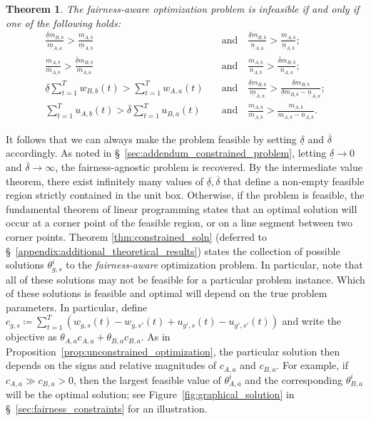 \documentclass[letterpaper]{article} %
\newtheorem{theorem}{Theorem}
\begin{document}
\begin{theorem}\label{theorem:feasibility}
The fairness-aware optimization problem is infeasible if and only if one of the following holds:
\footnotesize
    \begin{align*}
    \frac{\underline{\delta}m_{B,b}}{\underline{m}_{A,a}} > \frac{m_{A,b}}{\underline{m}_{A,b}}\quad &\text{and}\quad \frac{\underline{\delta}m_{B,b}}{\underline{n}_{A,a}} > \frac{m_{A,b}}{\underline{n}_{A,b}}; \\
    \frac{m_{A,b}}{\overline{m}_{A,b}} > \frac{\overline{\delta}m_{B,b}}{\overline{m}_{A,a}}\quad &\text{and}\quad \frac{m_{A,b}}{\overline{n}_{A,b}} > \frac{\overline{\delta} m_{B,b}}{\overline{n}_{A,a}}; \\
    \underline{\delta} \sum_{t=1}^T w_{B,b}(t) > \sum_{t=1}^T w_{A,a}(t)\quad &\text{and}\quad \frac{\underline{\delta} m_{B,b}}{\underline{m}_{A,a}} > \frac{\underline{\delta} m_{B,b}}{\underline{\delta} m_{B,b} - \underline{n}_{A,a}} ; \\
    \sum_{t=1}^T u_{A,b}(t) > \overline{\delta} \sum_{t=1}^T u_{B,a}(t)\quad &\text{and}\quad \frac{m_{A,b}}{\overline{m}_{A,b}} > \frac{m_{A,b}}{m_{A,b} - \overline{n}_{A,b}}.
\end{align*}
\end{theorem}
It follows that we can always make the problem feasible by setting $\underline{\delta}$ and $\overline{\delta}$ accordingly.
As noted in \S~\ref{sec:addendum_constrained_problem}, letting $\underline{\delta} \to 0$ and $\overline{\delta} \to \infty$, the fairness-agnostic problem is recovered.
By the intermediate value theorem, there exist infinitely many values of $\underline{\delta},\overline{\delta}$ that define a non-empty feasible region strictly contained in the unit box.
Otherwise, if the problem is feasible, the fundamental theorem of linear programming states that an optimal solution will occur at a corner point of the feasible region, or on a line segment between two corner points.
Theorem \ref{thm:constrained_soln} (deferred to \S~\ref{appendix:additional_theoretical_results}) states the collection of possible solutions $\theta_{g,s}^i$ to the \emph{fairness-aware} optimization problem.
In particular, note that all of these solutions may not be feasible for a particular problem instance.
Which of these solutions is feasible and optimal will depend on the true problem parameters.
In particular, define $c_{g,s} \coloneqq \sum_{t=1}^T (w_{g,s}(t) - w_{g,s'}(t) + u_{g',s}(t) - u_{g',s'}(t))$ and write the objective as $\theta_{A,a}c_{A,a} + \theta_{B,a}c_{B,a}$.
As in Proposition~\ref{prop:unconstrained_optimization}, the particular solution then depends on the signs and relative magnitudes of $c_{A,a}$ and $c_{B,a}$.
For example, if $c_{A,a} \gg c_{B,a} > 0$, then the largest feasible value of $\theta_{A,a}^i$ and the corresponding $\theta_{B,a}^i$ will be the optimal solution; see Figure~\ref{fig:graphical_solution} in \S~\ref{sec:fairness_constraints} for an illustration.
\end{document}
